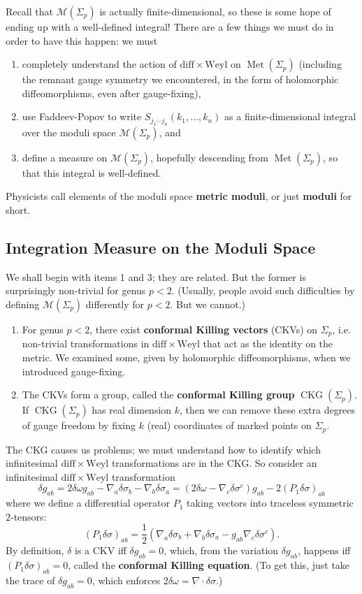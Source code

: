 \documentclass{report}
\theoremstyle{plain}
\theoremstyle{definition}
\theoremstyle{remark}
\newcommand{\cM}{\mathcal{M}}
\newcommand{\diff}{\mathrm{diff}}
\newcommand{\Weyl}{\mathrm{Weyl}}
\DeclareMathOperator{\Met}{Met}
\DeclareMathOperator{\CKG}{CKG}
\begin{document}
Recall that $\cM(\Sigma_p)$ is actually finite-dimensional, so these
is some hope of ending up with a well-defined integral! There are a
few things we must do in order to have this happen: we must
\begin{enumerate}
\item completely understand the action of $\diff \times \Weyl$ on
  $\Met(\Sigma_p)$ (including the remnant gauge symmetry we
  encountered, in the form of holomorphic diffeomorphisms, even after
  gauge-fixing),
\item use Faddeev-Popov to write $S_{j_1\cdots j_n}(k_1, \ldots, k_n)$
  as a finite-dimensional integral over the moduli space
  $\cM(\Sigma_p)$, and
\item define a measure on $\cM(\Sigma_p)$, hopefully descending from
  $\Met(\Sigma_p)$, so that this integral is well-defined.
\end{enumerate}
Physicists call elements of the moduli space {\bf metric moduli}, or
just {\bf moduli} for short.

\subsection{Integration Measure on the Moduli Space}

We shall begin with items 1 and 3; they are related. But the former is
surprisingly non-trivial for genus $p < 2$. (Usually, people avoid
such difficulties by defining $\cM(\Sigma_p)$ differently for $p < 2$.
But we cannot.)
\begin{enumerate}
\item For genus $p < 2$, there exist {\bf conformal Killing vectors}
  (CKVs) on $\Sigma_p$, i.e. non-trivial transformations in $\diff
  \times \Weyl$ that act as the identity on the metric. We examined
  some, given by holomorphic diffeomorphisms, when we introduced
  gauge-fixing.
\item The CKVs form a group, called the {\bf conformal Killing group}
  $\CKG(\Sigma_p)$. If $\CKG(\Sigma_p)$ has real dimension $k$, then
  we can remove these extra degrees of gauge freedom by fixing $k$
  (real) coordinates of marked points on $\Sigma_p$.
\end{enumerate}
The CKG causes us problems; we must understand how to identify which
infinitesimal $\diff \times \Weyl$ transformations are in the CKG. So
consider an infinitesimal $\diff \times \Weyl$ transformation
\[ \delta g_{ab} = 2\delta \omega g_{ab} - \nabla_a \delta \sigma_b - \nabla_b \delta \sigma_a = (2\delta \omega - \nabla_c \delta \sigma^c)g_{ab} - 2(P_1\delta \sigma)_{ab} \]
where we define a differential operator $P_1$ taking vectors into
traceless symmetric $2$-tensors:
\[ (P_1 \delta \sigma)_{ab} = \frac{1}{2}(\nabla_a \delta \sigma_b + \nabla_b \delta \sigma_a - g_{ab} \nabla_c \delta \sigma^c). \]
By definition, $\delta$ is a CKV iff $\delta g_{ab} = 0$, which, from
the variation $\delta g_{ab}$, happens iff $(P_1\delta\sigma)_{ab} =
0$, called the {\bf conformal Killing equation}. (To get this, just
take the trace of $\delta g_{ab} = 0$, which enforces $2\delta\omega =
\nabla \cdot \delta \sigma$.)
\end{document}
